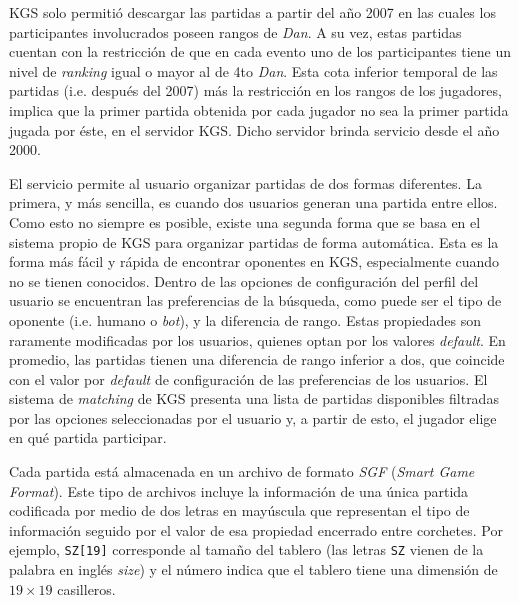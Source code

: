 \documentclass[11pt,twoside,spanish]{report} %
\begin{document}
KGS solo permiti\'o descargar las partidas a partir del a\~no 2007 en las cuales los participantes involucrados poseen rangos de \textit{Dan}.
A su vez, estas partidas cuentan con la restricci\'on de que en cada evento uno de los participantes tiene un nivel de \textit{ranking} igual o mayor al de 4to \textit{Dan}.
Esta cota inferior temporal de las partidas (i.e. despu\'es del 2007) m\'as la restricci\'on en los rangos de los jugadores, implica que la primer partida obtenida por cada jugador no sea la primer partida jugada por \'este, en el servidor KGS.
Dicho servidor brinda servicio desde el a\~no 2000.


El servicio permite al usuario organizar partidas de dos formas diferentes.
La primera, y m\'as sencilla, es cuando dos usuarios generan una partida entre ellos.
Como esto no siempre es posible, existe una segunda forma que se basa en el sistema propio de KGS para organizar partidas de forma autom\'atica.
Esta es la forma m\'as f\'acil y r\'apida de encontrar oponentes en KGS, especialmente cuando no se tienen conocidos.
Dentro de las opciones de configuraci\'on del perfil del usuario se encuentran las preferencias de la b\'usqueda, como puede ser el tipo de oponente (i.e. humano o \textit{bot}), y la diferencia de rango. 
Estas propiedades son raramente modificadas por los usuarios, quienes optan por los valores \emph{default}. 
En promedio, las partidas tienen una diferencia de rango inferior a dos, que coincide con el valor por \emph{default} de configuraci\'on de las preferencias de los usuarios.
El sistema de \emph{matching} de KGS presenta una lista de partidas disponibles filtradas por las opciones seleccionadas por el usuario y, a partir de esto, el jugador elige en qu\'e partida participar.

Cada partida est\'a almacenada en un archivo de formato \textit{SGF} (\textit{Smart Game Format}).
Este tipo de archivos incluye la informaci\'on de una \'unica partida codificada por medio de dos letras en may\'uscula que representan el tipo de informaci\'on seguido por el valor de esa propiedad encerrado entre corchetes.
Por ejemplo, \verb|SZ[19]| corresponde al tama\~no del tablero (las letras \verb|SZ| vienen de la palabra en ingl\'es \textit{size}) y el n\'umero indica que el tablero tiene una dimensi\'on de $19\times19$ casilleros.
\end{document}
